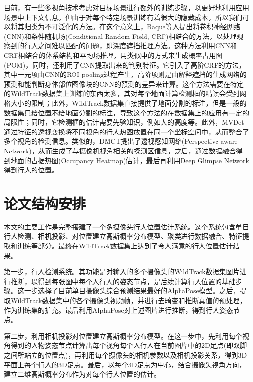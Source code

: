 目前，有一些多视角技术考虑对目标场景进行额外的训练步骤，以更好地利用应用场景中上下文信息。但由于对每个特定场景训练有着很大的隐藏成本，所以我们可以将其归类为不可泛化的方法\cite{lima2021generalizable}。在这个意义上，Baque等人\cite{baque2017deep}提出将卷积神经网络(CNN)和条件随机场(Conditional Random Field, CRF)相结合的方法，以处理观察到的行人之间难以匹配的问题，即深度遮挡推理方法\cite{baque2017deep}。这种方法利用CNN和CRF相结合的体系结构和平均场推理，用类似\cite{fleuret2007multicamera}中的方式来生成概率占用图(POM)，同时，还利用了CNN提取出来的判别特征。它引入了高阶CRF的方法，其中一元项由CNN的ROI pooling过程产生\cite{faster2015towards}，高阶项则是由解释遮挡的生成网络的预测和能判断身体部位图像块的CNN的预测的差异来计算。这个方法需要在特定的WildTrack数据集上训练的东西太多，其对每个地面计算检测框的精读会受到网格大小的限制；此外，WildTrack数据集直接提供了地面分割的标注，但是一般的数据集只给位置不给地面分割的标注，导致这个方法的在数据集上的应用有一定的局限性；同时，它检测框的估计需要先验知识，例如人的高度等。此外，MVDet\cite{hou2020multiview}通过特征的透视变换将不同视角的行人热图放置在同一个坐标空间中，从而整合了多个视角的检测信息。类似的，DMCT\cite{you2020real}提出了透视感知网络(Perspective-aware Network)，从而生成了与摄像机视角相关的探测区信息，之后，通过数据融合得到地面的占据热图(Occupancy Heatmap)估计，最后再利用Deep Glimpse Network得到行人的位置。

\section{论文结构安排}

本文的主要工作是完整搭建了一个多摄像头行人位置估计系统。这个系统包含单目行人检测、相机投影、对位置建立高斯概率分布模型、聚类进行数据融合、特征提取和训练等部分。最终在WildTrack数据集上达到了令人满意的行人位置估计结果。

第一步，行人检测系统。其功能是对输入的多个摄像头的WildTrack数据集图片进行推断，以得到每张图中每个人行人的姿态节点，是后续计算行人位置的基础步骤。这一步选择了目前单目摄像头综合预测结果最好的AlphaPose\cite{fang2017rmpe, li2018crowdpose, xiu2018poseflow}模型。之后，提取WildTrack数据集中的各个摄像头视频帧，并进行去畸变和推断真值的预处理，作为训练集的扩充。最后利用AlphaPose对上述图片进行推断，得到行人姿态节点。

第二步，利用相机投影对位置建立高斯概率分布模型。在这一步中，先利用每个视角得到的人物姿态节点计算出每个视角每个人行人在当前图片中的2D足点(即双脚之间所站立的位置点)，再利用每个摄像头的相机参数以及相机投影关系，得到3D平面上每个行人的3D足点。最后，以每个3D足点为中心，结合摄像头视角方向，建立二维高斯概率分布作为对每个行人位置的估计。

